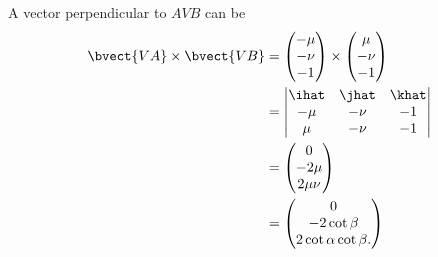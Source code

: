 \begin{enumerate}
          A vector perpendicular to \(AVB\) can be
          \begin{align*}
              \bvect{VA} \times \bvect{VB} & = \begin{pmatrix}
                                                   -\mu \\
                                                   -\nu \\
                                                   -1
                                               \end{pmatrix}
              \times
              \begin{pmatrix}
                  \mu  \\
                  -\nu \\
                  -1
              \end{pmatrix}                                                                  \\
                                           & = \begin{vmatrix}
                                                   \ihat & \jhat & \khat \\
                                                   - \mu & -\nu  & -1    \\
                                                   \mu   & -\nu  & -1
                                               \end{vmatrix}                          \\
                                           & = \begin{pmatrix}
                                                   0      \\
                                                   -2 \mu \\
                                                   2\mu \nu
                                               \end{pmatrix}                                 \\
                                           & = \begin{pmatrix}
                                                   0             \\
                                                   -2 \cot \beta \\
                                                   2 \cot \alpha \cot \beta.
                                               \end{pmatrix}                       \\

\end{align*}
\end{enumerate}
